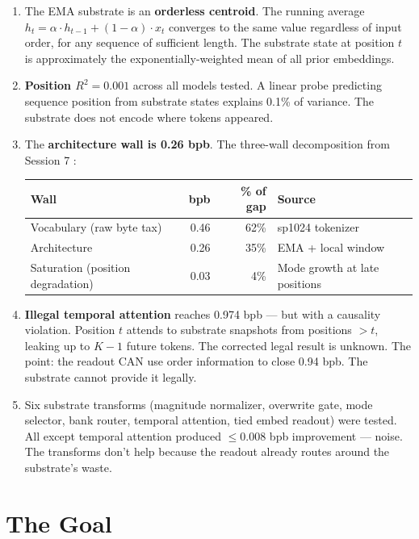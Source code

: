 \documentclass[11pt,a4paper]{report}
\begin{document}
\begin{enumerate}[nosep]
\item The EMA substrate is an \textbf{orderless centroid}. The running average $h_t = \alpha \cdot h_{t-1} + (1 - \alpha) \cdot x_t$ converges to the same value regardless of input order, for any sequence of sufficient length. The substrate state at position $t$ is approximately the exponentially-weighted mean of all prior embeddings.

\item \textbf{Position $R^2 = 0.001$} across all models tested. A linear probe predicting sequence position from substrate states explains 0.1\% of variance. The substrate does not encode where tokens appeared.

\item The \textbf{architecture wall is 0.26 bpb}. The three-wall decomposition from Session 7 \cite{session7}:
\begin{center}
\begin{tabular}{lrrl}
\toprule
Wall & bpb & \% of gap & Source \\
\midrule
Vocabulary (raw byte tax) & 0.46 & 62\% & sp1024 tokenizer \\
Architecture & 0.26 & 35\% & EMA + local window \\
Saturation (position degradation) & 0.03 & 4\% & Mode growth at late positions \\
\bottomrule
\end{tabular}
\end{center}

\item \textbf{Illegal temporal attention} reaches 0.974 bpb --- but with a causality violation. Position $t$ attends to substrate snapshots from positions $> t$, leaking up to $K - 1$ future tokens. The corrected legal result is unknown. The point: the readout CAN use order information to close 0.94 bpb. The substrate cannot provide it legally.

\item Six substrate transforms (magnitude normalizer, overwrite gate, mode selector, bank router, temporal attention, tied embed readout) were tested. All except temporal attention produced $\leq 0.008$ bpb improvement --- noise. The transforms don't help because the readout already routes around the substrate's waste.
\end{enumerate}

\section{The Goal}
\end{document}
